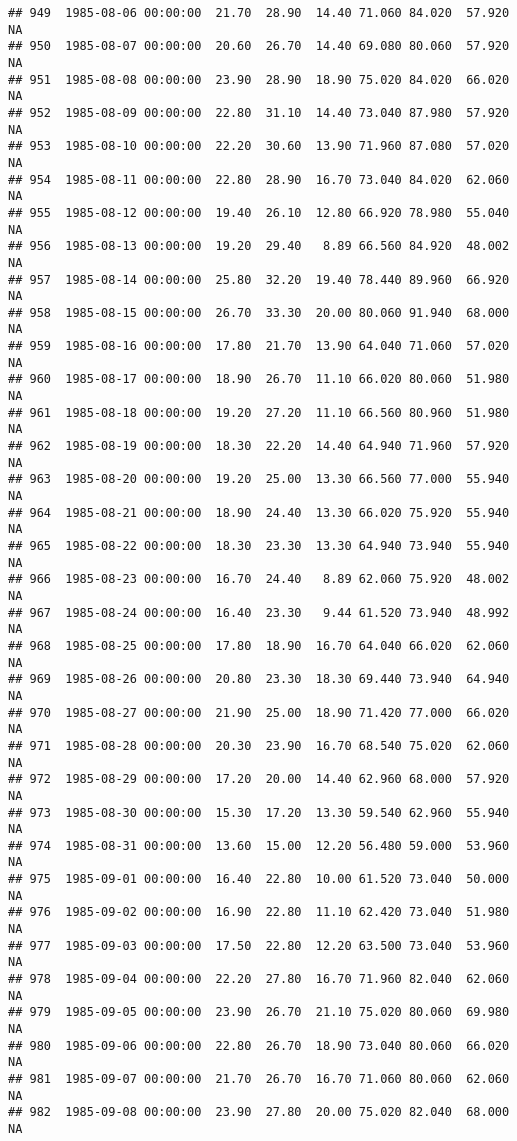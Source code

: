 \documentclass{article}\usepackage{graphicx, color}
\makeatletter
\newenvironment{kframe}{%
 \def\at@end@of@kframe{}%
 \ifinner\ifhmode%
  \def\at@end@of@kframe{\end{minipage}}%
  \begin{minipage}{\columnwidth}%
 \fi\fi%
 \def\FrameCommand##1{\hskip\@totalleftmargin \hskip-\fboxsep
 \colorbox{shadecolor}{##1}\hskip-\fboxsep
     \hskip-\linewidth \hskip-\@totalleftmargin \hskip\columnwidth}%
 \MakeFramed {\advance\hsize-\width
   \@totalleftmargin\z@ \linewidth\hsize
   \@setminipage}}%
 {\par\unskip\endMakeFramed%
 \at@end@of@kframe}
\newenvironment{knitrout}{}{} %
\makeatother
\begin{document}
\begin{knitrout}
\begin{kframe}
\begin{verbatim}
## 949  1985-08-06 00:00:00  21.70  28.90  14.40 71.060 84.020  57.920     NA
## 950  1985-08-07 00:00:00  20.60  26.70  14.40 69.080 80.060  57.920     NA
## 951  1985-08-08 00:00:00  23.90  28.90  18.90 75.020 84.020  66.020     NA
## 952  1985-08-09 00:00:00  22.80  31.10  14.40 73.040 87.980  57.920     NA
## 953  1985-08-10 00:00:00  22.20  30.60  13.90 71.960 87.080  57.020     NA
## 954  1985-08-11 00:00:00  22.80  28.90  16.70 73.040 84.020  62.060     NA
## 955  1985-08-12 00:00:00  19.40  26.10  12.80 66.920 78.980  55.040     NA
## 956  1985-08-13 00:00:00  19.20  29.40   8.89 66.560 84.920  48.002     NA
## 957  1985-08-14 00:00:00  25.80  32.20  19.40 78.440 89.960  66.920     NA
## 958  1985-08-15 00:00:00  26.70  33.30  20.00 80.060 91.940  68.000     NA
## 959  1985-08-16 00:00:00  17.80  21.70  13.90 64.040 71.060  57.020     NA
## 960  1985-08-17 00:00:00  18.90  26.70  11.10 66.020 80.060  51.980     NA
## 961  1985-08-18 00:00:00  19.20  27.20  11.10 66.560 80.960  51.980     NA
## 962  1985-08-19 00:00:00  18.30  22.20  14.40 64.940 71.960  57.920     NA
## 963  1985-08-20 00:00:00  19.20  25.00  13.30 66.560 77.000  55.940     NA
## 964  1985-08-21 00:00:00  18.90  24.40  13.30 66.020 75.920  55.940     NA
## 965  1985-08-22 00:00:00  18.30  23.30  13.30 64.940 73.940  55.940     NA
## 966  1985-08-23 00:00:00  16.70  24.40   8.89 62.060 75.920  48.002     NA
## 967  1985-08-24 00:00:00  16.40  23.30   9.44 61.520 73.940  48.992     NA
## 968  1985-08-25 00:00:00  17.80  18.90  16.70 64.040 66.020  62.060     NA
## 969  1985-08-26 00:00:00  20.80  23.30  18.30 69.440 73.940  64.940     NA
## 970  1985-08-27 00:00:00  21.90  25.00  18.90 71.420 77.000  66.020     NA
## 971  1985-08-28 00:00:00  20.30  23.90  16.70 68.540 75.020  62.060     NA
## 972  1985-08-29 00:00:00  17.20  20.00  14.40 62.960 68.000  57.920     NA
## 973  1985-08-30 00:00:00  15.30  17.20  13.30 59.540 62.960  55.940     NA
## 974  1985-08-31 00:00:00  13.60  15.00  12.20 56.480 59.000  53.960     NA
## 975  1985-09-01 00:00:00  16.40  22.80  10.00 61.520 73.040  50.000     NA
## 976  1985-09-02 00:00:00  16.90  22.80  11.10 62.420 73.040  51.980     NA
## 977  1985-09-03 00:00:00  17.50  22.80  12.20 63.500 73.040  53.960     NA
## 978  1985-09-04 00:00:00  22.20  27.80  16.70 71.960 82.040  62.060     NA
## 979  1985-09-05 00:00:00  23.90  26.70  21.10 75.020 80.060  69.980     NA
## 980  1985-09-06 00:00:00  22.80  26.70  18.90 73.040 80.060  66.020     NA
## 981  1985-09-07 00:00:00  21.70  26.70  16.70 71.060 80.060  62.060     NA
## 982  1985-09-08 00:00:00  23.90  27.80  20.00 75.020 82.040  68.000     NA

\end{verbatim}
\end{kframe}
\end{knitrout}
\end{document}
